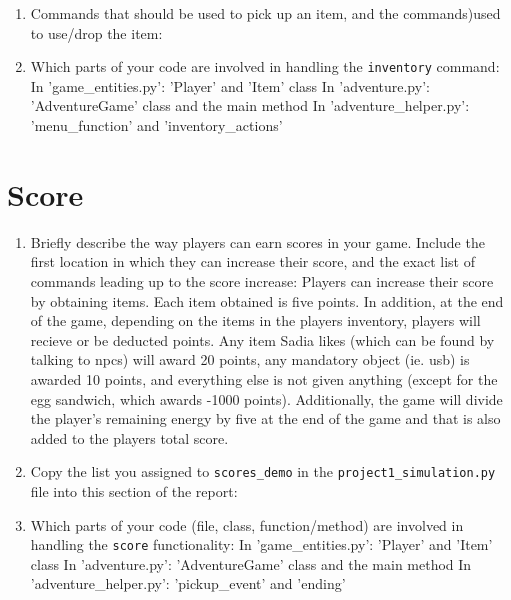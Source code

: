 \documentclass[11pt]{article}
\begin{document}
\begin{enumerate}
    \item Commands that should be used to pick up an item, and the commands)used to use/drop the item: 
    \item Which parts of your code  are involved in handling the \texttt{inventory} command: \newline
    In 'game\_entities.py': 'Player' and 'Item' class \newline
    In 'adventure.py': 'AdventureGame' class and the main method
    In 'adventure\_helper.py': 'menu\_function' and 'inventory\_actions'
\end{enumerate}

\section*{Score}
\begin{enumerate}

    \item Briefly describe the way players can earn scores in your game. Include the first location in which they can increase their score, and the exact list of commands leading up to the score increase: \newline
    Players can increase their score by obtaining items. Each item obtained is five points. In addition, at the end of the game, depending on the items in the players inventory, players will recieve or be deducted points. Any item Sadia likes (which can be found by talking to npcs) will award 20 points, any mandatory object (ie. usb) is awarded 10 points, and everything else is not given anything (except for the egg sandwich, which awards -1000 points). Additionally, the game will divide the player's remaining energy by five at the end of the game and that is also added to the players total score.

    \item Copy the list you assigned to \texttt{scores\_demo} in the \texttt{project1\_simulation.py} file into this section of the report: 


    \item Which parts of your code (file, class, function/method) are involved in handling the \texttt{score} functionality:
    In 'game\_entities.py': 'Player' and 'Item' class \newline
    In 'adventure.py': 'AdventureGame' class and the main method
    In 'adventure\_helper.py': 'pickup\_event' and 'ending'

\end{enumerate}
\end{document}
